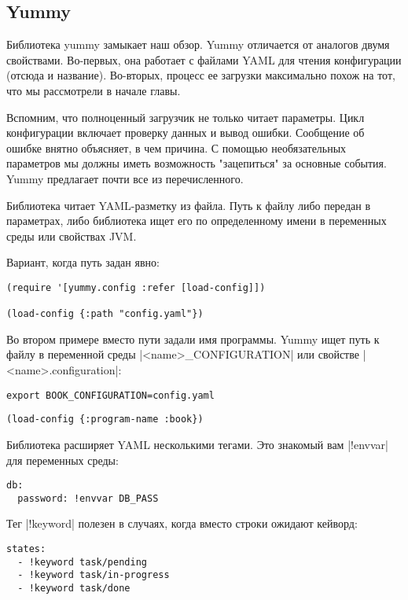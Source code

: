 \subsection{Yummy}

Библиотека yummy замыкает наш обзор. Yummy отличается от аналогов двумя
свойствами. Во-первых, она работает с файлами YAML для чтения конфигурации
(отсюда и название). Во-вторых, процесс ее загрузки максимально похож на тот,
что мы рассмотрели в начале главы.

Вспомним, что полноценный загрузчик не только читает параметры. Цикл
конфигурации включает проверку данных и вывод ошибки. Сообщение об ошибке внятно
объясняет, в чем причина. С помощью необязательных параметров мы должны иметь
возможность "зацепиться" за основные события. Yummy предлагает почти все из
перечисленного.

Библиотека читает YAML-разметку из файла. Путь к файлу либо передан в
параметрах, либо библиотека ищет его по определенному имени в переменных среды
или свойствах JVM.

Вариант, когда путь задан явно:

\begin{verbatim}
(require '[yummy.config :refer [load-config]])

(load-config {:path "config.yaml"})
\end{verbatim}

Во втором примере вместо пути задали имя программы. Yummy ищет путь к файлу в
переменной среды \spverb|<name>_CONFIGURATION| или свойстве \spverb|<name>.configuration|:

\begin{verbatim}
export BOOK_CONFIGURATION=config.yaml
\end{verbatim}

\begin{verbatim}
(load-config {:program-name :book})
\end{verbatim}

Библиотека расширяет YAML несколькими тегами. Это знакомый вам \spverb|!envvar| для
переменных среды:

\begin{verbatim}
db:
  password: !envvar DB_PASS
\end{verbatim}

Тег \spverb|!keyword| полезен в случаях, когда вместо строки ожидают кейворд:

\begin{verbatim}
states:
  - !keyword task/pending
  - !keyword task/in-progress
  - !keyword task/done
\end{verbatim}


